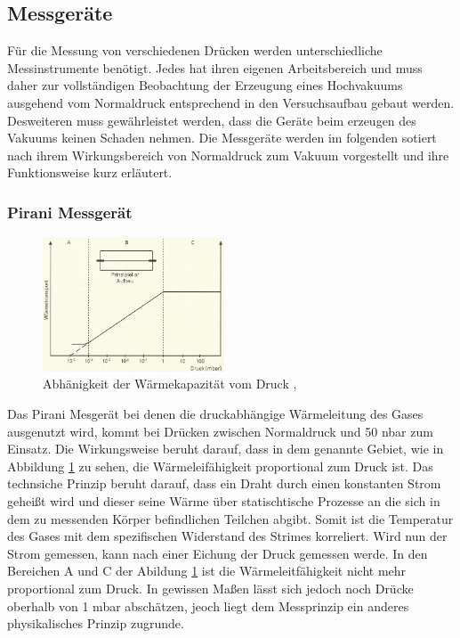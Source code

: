 \subsection{Messgeräte}
Für die Messung von verschiedenen Drücken werden unterschiedliche Messinstrumente benötigt. Jedes hat ihren eigenen Arbeitsbereich und muss daher zur vollständigen Beobachtung der Erzeugung eines Hochvakuums ausgehend vom Normaldruck entsprechend in den Versuchsaufbau gebaut werden. Desweiteren muss gewährleistet werden, dass die Geräte beim erzeugen des Vakuums keinen Schaden nehmen. Die Messgeräte werden im folgenden sotiert nach ihrem Wirkungsbereich von Normaldruck zum Vakuum vorgestellt und ihre Funktionsweise kurz erläutert.

\subsubsection{Pirani Messgerät}
\begin{figure}
  \centering
  \includegraphics[width=0.48\textwidth]{picture/Pirani.JPG}
  \caption{Abhänigkeit der Wärmekapazität vom Druck \cite{Dreh}, \cite{Jena}}
  \label{fig:pirani}
  \vspace{-0.6cm}
\end{figure}
Das Pirani Mesgerät bei denen die druckabhängige Wärmeleitung des Gases ausgenutzt wird, kommt bei Drücken zwischen Normaldruck und 50 nbar zum Einsatz. Die Wirkungsweise beruht darauf, dass in dem genannte Gebiet, wie in Abbildung \ref{fig:pirani} zu sehen, die Wärmeleifähigkeit proportional zum Druck ist. Das technsiche Prinzip beruht darauf, dass ein Draht durch einen konstanten Strom geheißt wird und dieser seine Wärme über statischtische Prozesse an die sich in dem zu messenden Körper befindlichen Teilchen abgibt. Somit ist die Temperatur des Gases mit dem spezifischen Widerstand des Strimes korreliert. Wird nun der Strom gemessen, kann nach einer Eichung der Druck gemessen werde. In den Bereichen A und C der Abildung \ref{fig:pirani} ist die Wärmeleitfähigkeit nicht mehr proportional zum Druck. In gewissen Maßen lässt sich jedoch noch Drücke oberhalb von 1 mbar abschätzen, jeoch liegt dem Messprinzip ein anderes physikalisches Prinzip zugrunde.

